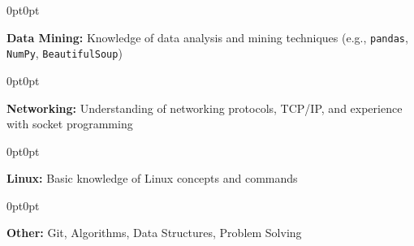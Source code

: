 \documentclass[10pt, a4paper]{article}
\newenvironment{onecolentry}{
    \begin{adjustwidth}{0pt}{0pt}
}{\end{adjustwidth}}
\begin{document}
\vspace{0.1 cm}

\begin{onecolentry}
    \textbf{Data Mining:} Knowledge of data analysis and mining techniques (e.g., \texttt{pandas}, \texttt{NumPy}, \texttt{BeautifulSoup})
\end{onecolentry}

\vspace{0.1 cm}

\begin{onecolentry}
    \textbf{Networking:} Understanding of networking protocols, TCP/IP, and experience with socket programming
\end{onecolentry}

\vspace{0.1 cm}

\begin{onecolentry}
    \textbf{Linux:} Basic knowledge of Linux concepts and commands
\end{onecolentry}

\vspace{0.1 cm}

\begin{onecolentry}
    \textbf{Other:} Git, Algorithms, Data Structures, Problem Solving
\end{onecolentry}
\end{document}
